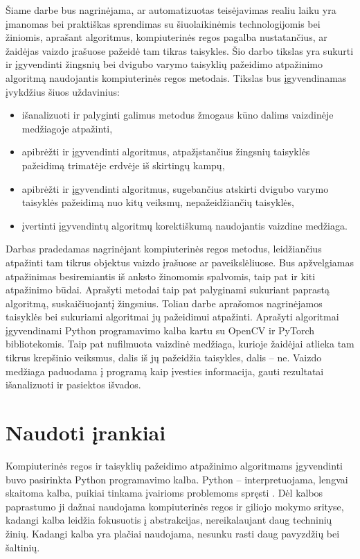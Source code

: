 \documentclass{VUMIFPSbakalaurinis}
\begin{document}
Šiame darbe bus nagrinėjama, ar automatizuotas teisėjavimas realiu laiku yra įmanomas bei praktiškas sprendimas su šiuolaikinėmis technologijomis bei žiniomis, aprašant algoritmus, kompiuterinės regos pagalba nustatančius, ar žaidėjas vaizdo įrašuose pažeidė tam tikras taisykles. Šio darbo tikslas yra sukurti ir įgyvendinti žingsnių bei dvigubo varymo taisyklių pažeidimo atpažinimo algoritmą naudojantis kompiuterinės regos metodais. Tikslas bus įgyvendinamas įvykdžius šiuos uždavinius:

\begin{itemize}
	\item išanalizuoti ir palyginti galimus metodus žmogaus kūno dalims vaizdinėje medžiagoje atpažinti,
	\item apibrėžti ir įgyvendinti algoritmus, atpažįstančius žingsnių taisyklės pažeidimą
	trimatėje erdvėje iš skirtingų kampų,
	\item apibrėžti ir įgyvendinti algoritmus, sugebančius atskirti dvigubo varymo
	taisyklės pažeidimą nuo kitų veiksmų, nepažeidžiančių taisyklės,
	\item įvertinti įgyvendintų algoritmų korektiškumą naudojantis vaizdine medžiaga.
\end{itemize}

Darbas pradedamas nagrinėjant kompiuterinės regos metodus, leidžiančius atpažinti tam tikrus objektus vaizdo įrašuose ar paveikslėliuose. Bus apžvelgiamas atpažinimas besiremiantis iš anksto žinomomis spalvomis, taip pat ir kiti atpažinimo būdai. Aprašyti metodai taip pat palyginami sukuriant paprastą algoritmą, suskaičiuojantį žingsnius. Toliau darbe aprašomos nagrinėjamos taisyklės bei sukuriami algoritmai jų pažeidimui atpažinti. Aprašyti algoritmai įgyvendinami Python programavimo kalba kartu su OpenCV ir PyTorch bibliotekomis. Taip pat nufilmuota vaizdinė medžiaga, kurioje žaidėjai atlieka tam tikrus krepšinio veiksmus, dalis iš jų pažeidžia taisykles, dalis – ne. Vaizdo medžiaga paduodama į programą kaip įvesties informacija, gauti rezultatai išanalizuoti ir pasiektos išvados.


\section{Naudoti įrankiai}

Kompiuterinės regos ir taisyklių pažeidimo atpažinimo algoritmams įgyvendinti buvo pasirinkta Python programavimo kalba. Python – interpretuojama, lengvai skaitoma kalba, puikiai tinkama įvairioms problemoms spręsti \cite{Python}. Dėl kalbos paprastumo ji dažnai naudojama kompiuterinės regos ir giliojo mokymo srityse, kadangi kalba leidžia fokusuotis į abstrakcijas, nereikalaujant daug techninių žinių. Kadangi kalba yra plačiai naudojama, nesunku rasti daug pavyzdžių bei šaltinių. 
\end{document}
